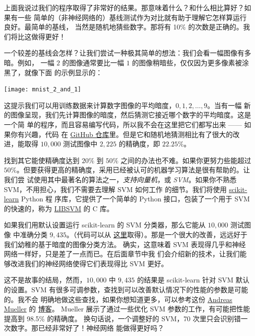 

上面我说过我们的程序取得了非常好的结果。那意味着什么？和什么相比算好？如果有一些
简单的（非神经网络的）基线测试作为对比就有助于理解它怎样算运行良好。最简单的基线，
当然是随机地猜些数字。那将有 10\% 的次数是正确的。我们将比这做得更好！

一个较差的基线会怎样？让我们尝试一种极其简单的想法：我们会看一幅图像有多暗。例如，
一幅 $2$ 的图像通常要比一幅 $1$ 的图像稍暗些，仅仅因为更多像素被涂黑了，就像下面
的示例显示的：
\begin{center}
  \texttt{[image: mnist\_2\_and\_1]}
\end{center}

这提示我们可以用训练数据来计算数字图像的平均暗度，$0, 1, 2,\ldots, 9$。当有一幅
新的图像呈现，我们先计算图像的暗度，然后猜测它接近哪个数字的平均暗度。这是一个简
单的程序，而且容易编写代码，所以我不会在这里把它们都写出来 —— 如果你有兴趣，代码
在
\href{https://github.com/mnielsen/neural-networks-and-deep-learning/blob/master/src/mnist_average_darkness.py}{GitHub
  仓库}里。但是它和随机地猜测相比有了很大的改进，能取得 $10,000$ 测试图像中
$2,225$ 的精确度，即 $22.25\%$。

找到其它能使精确度达到 $20\%$ 到 $50\%$ 之间的办法也不难。如果你更努力些能超过
$50\%$。但要获得更高的精确度，采用已经被认可的机器学习算法是很有帮助的。让我们尝
试使用其中最著名的算法之一，\emph{支持向量机}，或
\emph{SVM}。如果你不熟悉 SVM，不用担心，我们不需要去理解 SVM 如何工作
的细节。我们将使用 \href{http://scikit-learn.org/stable/}{scikit-learn} Python 程
序库，它提供了一个简单的 Python 接口，包装了一个用于 SVM 的快速的，称为
\href{http://www.csie.ntu.edu.tw/~cjlin/libsvm/}{LIBSVM} 的 C 库。

如果我们用默认设置运行 scikit-learn 的 SVM 分类器，那么它能从 $10,000$ 测试图像
中准确分类 $9,435$。（代码可以从%
  \href{https://github.com/mnielsen/neural-networks-and-deep-learning/blob/master/src/mnist_svm.py}{
    这里}取得）。那是一个很大的改善，远远好于我们幼稚的基于暗度的图像分类方法。
确实，这意味着 SVM 表现得几乎和神经网络一样好，只是差了一点而已。在后面章节中我
们会介绍新的技术，让我们能够改进我们的神经网络使得它们表现得比 SVM 更好。

这不是故事的结局，然而，$10,000$ 中 $9,435$ 的结果是 scikit-learn 针对 SVM 默认
的设置。SVM 有很多可调参数，查找到可以改善默认情况下的性能的参数是可能的。我不会
明确地做这些查找，如果你想知道更多，可以参考这份
\href{http://peekaboo-vision.blogspot.ca/}{Andreas Mueller} 的%
\href{http://peekaboo-vision.blogspot.de/2010/09/mnist-for-ever.html}{博客}。
Mueller 展示了通过一些优化 SVM 参数的工作，有可能把性能提高到 98.5\% 的精确度。
换句话说，一个调整好的 SVM，70 次里只会识别错一次数字。那已经非常好了！神经网络
能做得更好吗？

